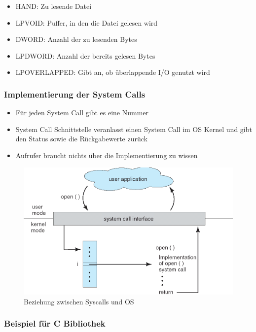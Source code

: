 \documentclass[a4paper]{scrreprt}
\begin{document}
\begin{itemize}
	\item HAND: Zu lesende Datei
	\item LPVOID: Puffer, in den die Datei gelesen wird
	\item DWORD: Anzahl der zu lesenden Bytes
	\item LPDWORD: Anzahl der bereits gelesen Bytes
	\item LPOVERLAPPED: Gibt an, ob überlappende I/O genutzt wird
\end{itemize}

\subsubsection{Implementierung der System Calls}
\begin{itemize}
	\item Für jeden System Call gibt es eine Nummer
	\item System Call Schnittstelle veranlasst einen System Call im OS Kernel und gibt den Status sowie die Rückgabewerte zurück
	\item Aufrufer braucht nichts über die Implementierung zu wissen
\end{itemize}

\begin{figure}[ht]
\centering
\includegraphics[scale=0.4]{graphics/syscall_os_relationship.png}
\caption{Beziehung zwischen Syscalls und OS}
\end{figure}

\subsubsection{Beispiel für C Bibliothek}
\end{document}
